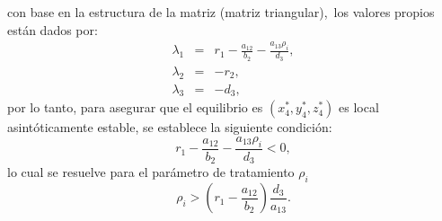 \documentclass[letterpaper,11pt]{article}
\begin{document}
con base en la estructura de la matriz (matriz triangular),\ los valores
propios est\'{a}n dados por: 
\begin{eqnarray*}
\lambda _{1} &=&r_{1}-\frac{a_{12}}{b_{2}}-\frac{a_{13}\rho _{i}}{d_{3}}, \\
\lambda _{2} &=&-r_{2}, \\
\lambda _{3} &=&-d_{3},
\end{eqnarray*}%
por lo tanto, para asegurar que el equilibrio es $\left( x_{4}^{\ast
},y_{4}^{\ast },z_{4}^{\ast }\right) $ es local asint\'{o}ticamente estable,
se establece la siguiente condici\'{o}n:\ 
\begin{equation*}
r_{1}-\frac{a_{12}}{b_{2}}-\frac{a_{13}\rho _{i}}{d_{3}}<0,
\end{equation*}%
lo cual se resuelve para el par\'{a}metro de tratamiento $\rho _{i}$ 
\begin{equation*}
\rho _{i}>\left( r_{1}-\frac{a_{12}}{b_{2}}\right) \frac{d_{3}}{a_{13}}.
\end{equation*}
\end{document}
